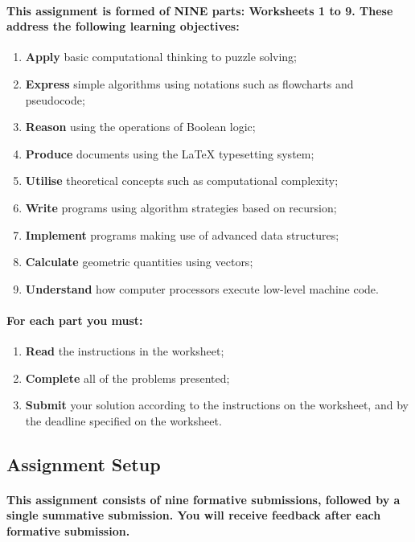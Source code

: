 \documentclass{../../fal_assignment}
\begin{document}
\paragraph{This assignment is formed of \textbf{NINE} parts: Worksheets 1 to 9.
These address the following learning objectives:}
\begin{enumerate}[label=(\arabic*)]
	\item \textbf{Apply} basic computational thinking to puzzle solving;
	\item \textbf{Express} simple algorithms using notations such as flowcharts and pseudocode;
	\item \textbf{Reason} using the operations of Boolean logic;
	\item \textbf{Produce} documents using the LaTeX typesetting system;
	\item \textbf{Utilise} theoretical concepts such as computational complexity;
	\item \textbf{Write} programs using algorithm strategies based on recursion;
	\item \textbf{Implement} programs making use of advanced data structures;
	\item \textbf{Calculate} geometric quantities using vectors;
	\item \textbf{Understand} how computer processors execute low-level machine code.
\end{enumerate}

\paragraph{For each part you must:}
\begin{enumerate}[label=(\roman*)]
    \item \textbf{Read} the instructions in the worksheet;
    \item \textbf{Complete} all of the problems presented;
    \item \textbf{Submit} your solution according to the instructions on the worksheet, and by the deadline specified on the worksheet.
\end{enumerate}

\subsection*{Assignment Setup} 

\paragraph{This assignment consists of \textbf{nine formative submissions}, followed by a \textbf{single summative submission}.
You will receive \textbf{feedback} after each formative submission.}
\end{document}
